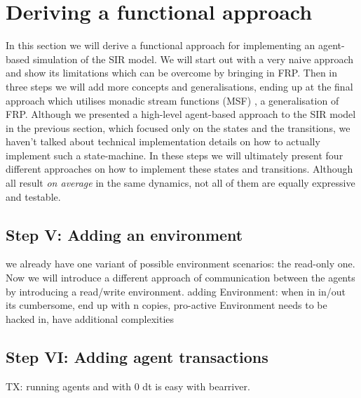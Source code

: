 \section{Deriving a functional approach}

In this section we will derive a functional approach for implementing an agent-based simulation of the SIR model. We will start out with a very naive approach and show its limitations which can be overcome by bringing in FRP. Then in three steps we will add more concepts and generalisations, ending up at the final approach which utilises monadic stream functions (MSF) \cite{perez_functional_2016}, a generalisation of FRP.
Although we presented a high-level agent-based approach to the SIR model in the previous section, which focused only on the states and the transitions, we haven't talked about technical implementation details on how to actually implement such a state-machine. In these steps we will ultimately present four different approaches on how to implement these states and transitions. Although all result \textit{on average} in the same dynamics, not all of them are equally expressive and testable.









\subsection{Step V: Adding an environment}
we already have one variant of possible environment scenarios: the read-only one. Now we will introduce a different approach of communication between the agents by introducing a read/write environment.
adding Environment: when in in/out its cumbersome, end up with n copies, pro-active Environment needs to be hacked in, have additional complexities

\subsection{Step VI: Adding agent transactions}
TX: running agents and with 0 dt is easy with bearriver.